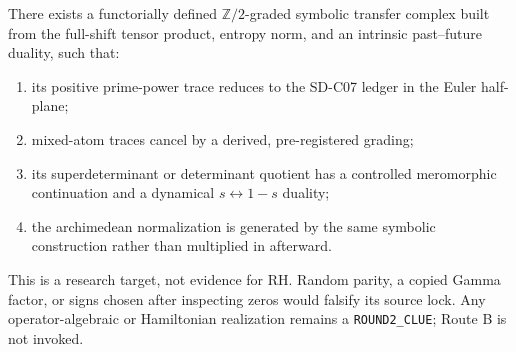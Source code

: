 \begin{conjecture}
\label{conj:graded-completion}
There exists a functorially defined $\mathbb Z/2$-graded symbolic transfer
complex built from the full-shift tensor product, entropy norm, and an
intrinsic past--future duality, such that:
\begin{enumerate}
  \item its positive prime-power trace reduces to the SD-C07 ledger in the
  Euler half-plane;
  \item mixed-atom traces cancel by a derived, pre-registered grading;
  \item its superdeterminant or determinant quotient has a controlled
  meromorphic continuation and a dynamical $s\leftrightarrow1-s$ duality;
  \item the archimedean normalization is generated by the same symbolic
  construction rather than multiplied in afterward.
\end{enumerate}
\end{conjecture}

This is a research target, not evidence for RH.  Random parity, a copied
Gamma factor, or signs chosen after inspecting zeros would falsify its source
lock.  Any operator-algebraic or Hamiltonian realization remains a
\texttt{ROUND2\_CLUE}; Route B is not invoked.
